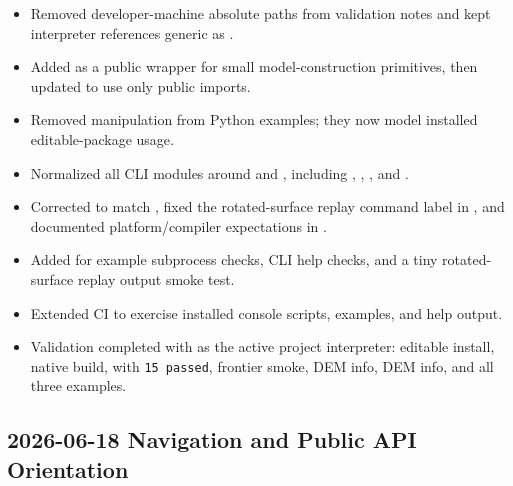 \begin{itemize}
\item Removed developer-machine absolute paths from validation notes and kept interpreter references generic as \texttt{}.
\item Added \texttt{} as a public wrapper for small model-construction primitives, then updated \texttt{} to use only public \texttt{} imports.
\item Removed \texttt{} manipulation from Python examples; they now model installed editable-package usage.
\item Normalized all CLI modules around \texttt{} and \texttt{}, including \texttt{}, \texttt{}, \texttt{}, and \texttt{}.
\item Corrected \texttt{} to match \texttt{}, fixed the rotated-surface replay command label in \texttt{}, and documented platform/compiler expectations in \texttt{}.
\item Added \texttt{} for example subprocess checks, CLI help checks, and a tiny rotated-surface replay output smoke test.
\item Extended CI to exercise installed console scripts, examples, and help output.
\item Validation completed with \texttt{} as the active project interpreter: editable install, native build, \texttt{} with \texttt{15 passed}, frontier smoke, \texttt{} DEM info, \texttt{} DEM info, and all three examples.
\end{itemize}

\subsection*{2026-06-18 Navigation and Public API Orientation}

